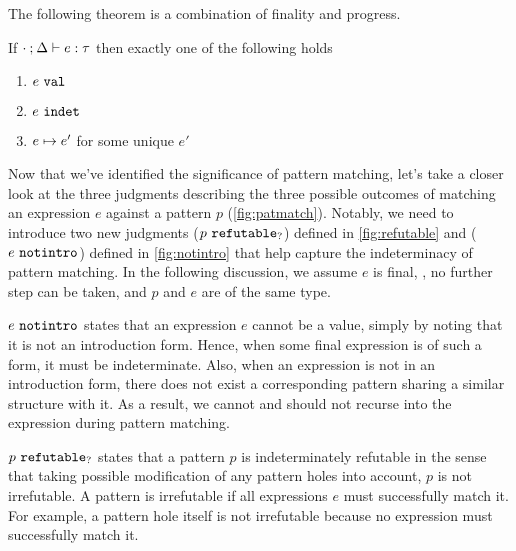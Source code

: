 The following theorem is a combination of finality and progress.
\begin{theorem}[Determinism]
  \label{theorem:determinism}
  If $\cdot \mathbin{;} \Delta \vdash e : \tau$ then exactly one of the following holds
  \begin{enumerate}
    \item $e ~\mathtt{val}$
    \item $e ~\mathtt{indet}$
    \item $e \mapsto e'$ for some unique $e'$
  \end{enumerate}
\end{theorem}




Now that we've identified the significance of pattern matching, let's take a closer look at the three judgments describing the three possible outcomes of matching an expression $e$ against a pattern $p$ (\autoref{fig:patmatch}). Notably, we need to introduce two new judgments ($p ~\mathtt{refutable}_?$) defined in \autoref{fig:refutable} and ($e ~\mathtt{notintro}$) defined in \autoref{fig:notintro} that help capture the indeterminacy of pattern matching. In the following discussion, we assume $e$ is final, \ie, no further step can be taken, and $p$ and $e$ are of the same type.

$e ~\mathtt{notintro}$ states that an expression $e$ cannot be a value, simply by noting that it is not an introduction form. Hence, when some final expression is of such a form, it must be indeterminate. Also, when an expression is not in an introduction form, there does not exist a corresponding pattern sharing a similar structure with it. As a result, we cannot and should not recurse into the expression during pattern matching.

$p ~\mathtt{refutable}_?$ states that a pattern $p$ is indeterminately refutable in the sense that taking possible modification of any pattern holes into account, $p$ is not irrefutable. A pattern is irrefutable if all expressions $e$ must successfully match it. For example, a pattern hole itself is not irrefutable because no expression must successfully match it.

